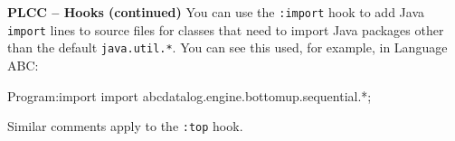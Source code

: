 \begin{minipage}[t]{\sw}
\slidenumber
\LARGE
{\bf PLCC -- Hooks (continued)}\exx
You can use the \verb':import' hook
to add Java \verb'import' lines to source files for classes
that need to import Java packages
other than the default \verb'java.util.*'.
You can see this used, for example, in Language ABC:
{\Large
\begin{qv}
Program:import
import abcdatalog.engine.bottomup.sequential.*;
\end{qv}
}
Similar comments apply to the \verb':top' hook.
\end{minipage}
\clearpage
